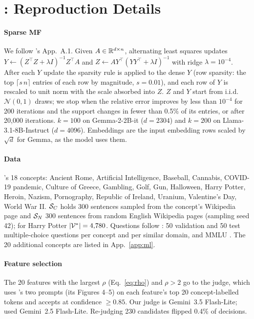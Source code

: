 \section{\ember{}: Reproduction Details}
\label{app:ember}

\paragraph{Sparse MF}
We follow \ember{}'s App.~A.1.
Given $A \in \mathbb{R}^{d \times n}$, alternating least squares updates $Y \leftarrow (Z^{\top}Z + \lambda I)^{-1}Z^{\top}A$ and $Z \leftarrow AY^{\top}(YY^{\top} + \lambda I)^{-1}$ with ridge $\lambda = 10^{-4}$.
After each $Y$ update the sparsity rule is applied to the dense $Y$ (row sparsity: the top $\lceil s\,n \rceil$ entries of each row by magnitude, $s = 0.01$), and each row of $Y$ is rescaled to unit norm with the scale absorbed into $Z$.
$Z$ and $Y$ start from i.i.d.\ $\mathcal N(0,1)$ draws; we stop when the relative error improves by less than $10^{-4}$ for 200 iterations and the support changes in fewer than 0.5\% of its entries, or after 20{,}000 iterations.
$k = 100$ on Gemma-2-2B-it ($d = 2304$) and $k = 200$ on Llama-3.1-8B-Instruct ($d = 4096$).
Embeddings are the input embedding rows scaled by $\sqrt d$ for Gemma, as the model uses them.

\paragraph{Data}
\ember{}'s 18 concepts: Ancient Rome, Artificial Intelligence, Baseball, Cannabis, COVID-19 pandemic, Culture of Greece, Gambling, Golf, Gun, Halloween, Harry Potter, Heroin, Nazism, Pornography, Republic of Ireland, Uranium, Valentine's Day, World War II.
$\mathcal{S}_C$ holds 300 sentences sampled from the concept's Wikipedia page and $\mathcal{S}_N$ 300 sentences from random English Wikipedia pages (sampling seed 42); for Harry Potter $|\mathcal{V}^*| = 4{,}780$.
Questions follow \ember{}: 50 validation and 50 test multiple-choice questions per concept and per similar domain, and MMLU \citep{hendrycks2021mmlu}.
The 20 additional concepts are listed in App.~\ref{app:ml}.

\paragraph{Feature selection}
The 20 features with the largest $\rho$ (Eq.~\ref{eq:rho}) and $\rho > 2$ go to the judge, which uses \ember{}'s two prompts (its Figures 4--5) on each feature's top 20 concept-labelled tokens and accepts at confidence $\geq 0.85$.
Our judge is Gemini~3.5 Flash-Lite; \ember{} used Gemini~2.5 Flash-Lite.
Re-judging 230 candidates flipped 0.4\% of decisions.

